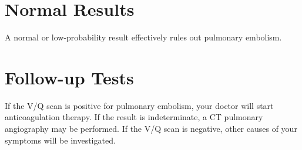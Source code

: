 \section*{Normal Results}
A normal or low-probability result effectively rules out pulmonary embolism.

\section*{Follow-up Tests}
If the V/Q scan is positive for pulmonary embolism, your doctor will start anticoagulation therapy. If the result is indeterminate, a CT pulmonary angiography may be performed. If the V/Q scan is negative, other causes of your symptoms will be investigated.
\clearpage
